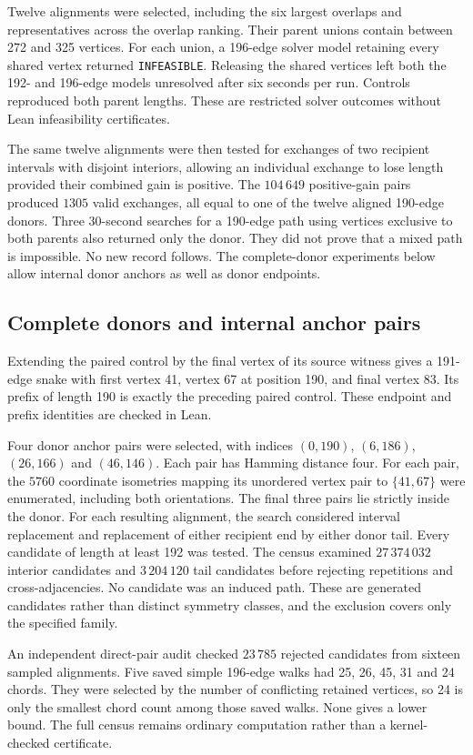 \documentclass[11pt,a4paper]{article}
\theoremstyle{definition}
\theoremstyle{remark}
\begin{document}
Twelve alignments were selected, including the six largest overlaps and representatives across the overlap ranking. Their parent unions contain between 272 and 325 vertices. For each union, a 196-edge solver model retaining every shared vertex returned \texttt{INFEASIBLE}. Releasing the shared vertices left both the 192- and 196-edge models unresolved after six seconds per run. Controls reproduced both parent lengths. These are restricted solver outcomes without Lean infeasibility certificates.

The same twelve alignments were then tested for exchanges of two recipient intervals with disjoint interiors, allowing an individual exchange to lose length provided their combined gain is positive. The $104\,649$ positive-gain pairs produced $1305$ valid exchanges, all equal to one of the twelve aligned 190-edge donors. Three 30-second searches for a 190-edge path using vertices exclusive to both parents also returned only the donor. They did not prove that a mixed path is impossible. No new record follows. The complete-donor experiments below allow internal donor anchors as well as donor endpoints.


\subsection{Complete donors and internal anchor pairs}
Extending the paired control by the final vertex of its source witness gives a 191-edge snake with first vertex 41, vertex 67 at position 190, and final vertex 83. Its prefix of length 190 is exactly the preceding paired control. These endpoint and prefix identities are checked in Lean.

Four donor anchor pairs were selected, with indices $(0,190)$, $(6,186)$, $(26,166)$ and $(46,146)$. Each pair has Hamming distance four. For each pair, the $5760$ coordinate isometries mapping its unordered vertex pair to $\{41,67\}$ were enumerated, including both orientations. The final three pairs lie strictly inside the donor. For each resulting alignment, the search considered interval replacement and replacement of either recipient end by either donor tail. Every candidate of length at least 192 was tested. The census examined $27\,374\,032$ interior candidates and $3\,204\,120$ tail candidates before rejecting repetitions and cross-adjacencies. No candidate was an induced path. These are generated candidates rather than distinct symmetry classes, and the exclusion covers only the specified family.

An independent direct-pair audit checked $23\,785$ rejected candidates from sixteen sampled alignments. Five saved simple 196-edge walks had 25, 26, 45, 31 and 24 chords. They were selected by the number of conflicting retained vertices, so 24 is only the smallest chord count among those saved walks. None gives a lower bound. The full census remains ordinary computation rather than a kernel-checked certificate.
\end{document}
